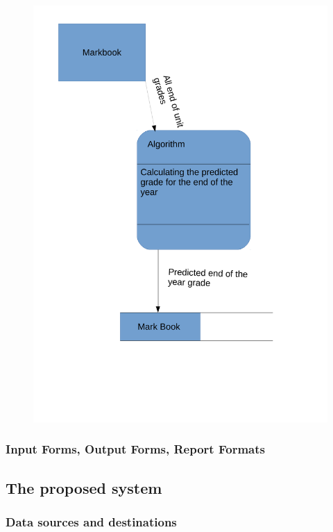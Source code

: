 \begin{figure}[H]
    \includegraphics[width=\textwidth]{./Analysis/images/DataFlowDiagrams2.pdf}
\end{figure}

\subsubsection{Input Forms, Output Forms, Report Formats}

\subsection{The proposed system}

\subsubsection{Data sources and destinations}

